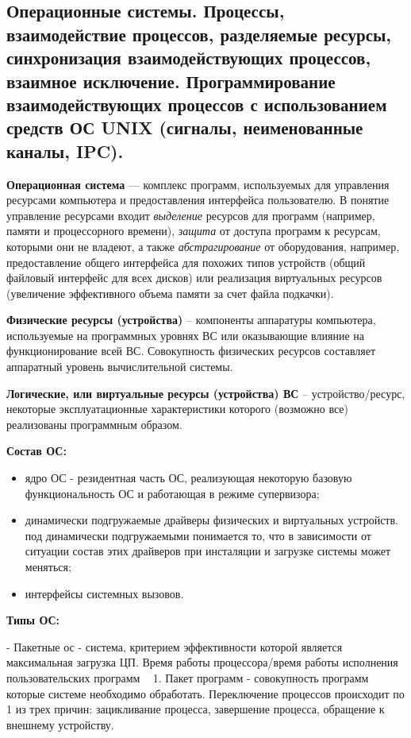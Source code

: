 \subsection{Операционные системы. Процессы, взаимодействие процессов, разделяемые ресурсы, синхронизация взаимодействующих процессов, взаимное исключение. Программирование взаимодействующих процессов с использованием средств ОС UNIX (сигналы, неименованные каналы, IPC).}

\textbf{Операционная система} --- комплекс программ, используемых для управления ресурсами компьютера и предоставления интерфейса пользователю.
В понятие управление ресурсами входит \textit{выделение} ресурсов для программ (например, памяти и процессорного времени),
\textit{защита} от доступа программ к ресурсам, которыми они не владеют, а также
\textit{абстрагирование} от оборудования, например, предоставление общего интерфейса для похожих типов устройств
(общий файловый интерфейс для всех дисков) или реализация виртуальных ресурсов (увеличение эффективного объема памяти за счет файла подкачки).

\textbf{Физические ресурсы (устройства)} -- компоненты аппаратуры компьютера, используемые на программных уровнях ВС или оказывающие влияние на функционирование всей ВС. Совокупность физических ресурсов составляет аппаратный уровень вычислительной системы.

\textbf{Логические, или виртуальные ресурсы (устройства) ВС} -- устройство/ресурс, некоторые эксплуатационные характеристики которого (возможно все) реализованы программным образом.

\textbf{Состав ОС:} 
\begin{itemize}
    \item ядро ОС - резидентная часть ОС, реализующая некоторую базовую функциональность ОС и работающая в режиме супервизора;
    \item динамически подгружаемые драйверы физических и виртуальных устройств. под динамически подгружаемыми понимается то, что в зависимости от ситуации состав этих драйверов при инсталяции и загрузке системы может меняться;
    \item интерфейсы системных вызовов.
\end{itemize} 

\textbf{Типы ОС:} 

- Пакетные ос  - система, критерием эффективности которой является максимальная загрузка ЦП. Время работы процессора/время работы исполнения пользовательских программ ~ 1. Пакет программ - совокупность программ которые системе необходимо обработать. Переключение процессов происходит по 1 из трех причин: зацикливание процесса, завершение процесса, обращение к внешнему устройству. 

